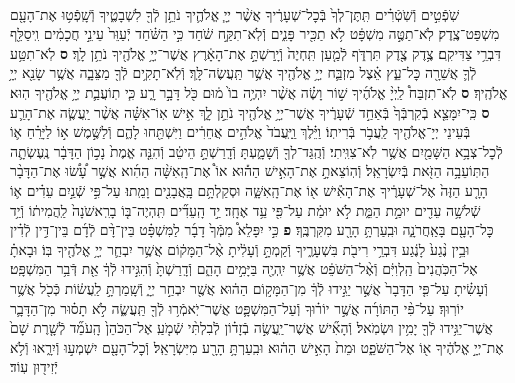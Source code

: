 \documentclass[twoside, openany, parskip=half, 11pt]{book}
\begin{document}
\begin{footnotesize}
\begin{multicols}{2}
\\
שֹֽׁפְֿטִ֣ים וְֿשֹֽׁטְֿרִ֗ים תִּֽתֶּן־לְךָ֙ בְּֿכׇל־שְׁעָרֶ֔יךָ אֲשֶׁ֨ר יְיָ֧ אֱלֹהֶ֛יךָ נֹתֵ֥ן לְֿךָ֖ לִשְׁבָטֶ֑יךָ וְֿשָֽׁפְֿט֥וּ אֶת־הָעָ֖ם מִשְׁפַּט־צֶֽדֶק׃ לֹֽא־תַטֶּ֣ה מִשְׁפָּ֔ט לֹ֥א תַכִּ֖יר פָּנִ֑ים וְֿלֹֽא־תִקַּ֣ח שֹׁ֔חַד כִּ֣י הַשֹּׁ֗חַד יְֿעַוֵּר֙ עֵינֵ֣י חֲכָמִ֔ים וִֽיסַלֵּ֖ף דִּבְרֵ֥י צַדִּיקִֽם׃ צֶ֥דֶק צֶ֖דֶק תִּרְדֹּ֑ף לְֿמַ֤עַן תִּֽחְיֶה֙ וְֿיָֽרַשְׁתָּ֣ אֶת־הָאָ֔רֶץ אֲשֶׁר־יְיָ֥ אֱלֹהֶ֖יךָ נֹתֵ֥ן לָֽךְ׃ \textbf{ס}
לֹֽא־תִטַּ֥ע לְֿךָ֛ אֲשֵׁרָ֖ה כׇּל־עֵ֑ץ אֵ֗צֶל מִזְבַּ֛ח יְיָ֥ אֱלֹהֶ֖יךָ אֲשֶׁ֥ר תַּֽעֲשֶׂה־לָּֽךְ׃ וְֿלֹֽא־תָקִ֥ים לְֿךָ֖ מַצֵּבָ֑ה אֲשֶׁ֥ר שָׂנֵ֖א יְיָ֥ אֱלֹהֶֽיךָ׃ \textbf{ס} לֹֽא־תִזְבַּח֩ לַֽיְיָ֨ אֱלֹהֶ֜יךָ שׁ֣וֹר וָשֶׂ֗ה אֲשֶׁ֨ר יִהְיֶ֥ה בוֹ֙ מ֔וּם כֹּ֖ל דָּבָ֣ר רָ֑ע כִּ֧י תֽוֹעֲבַ֛ת יְיָ֥ אֱלֹהֶ֖יךָ הֽוּא׃ \textbf{ס} כִּֽי־יִמָּצֵ֤א בְֿקִרְבְּֿךָ֙ בְּֿאַחַ֣ד שְֿׁעָרֶ֔יךָ אֲשֶׁר־יְיָ֥ אֱלֹהֶ֖יךָ נֹתֵ֣ן לָ֑ךְ אִ֣ישׁ אֽוֹ־אִשָּׁ֗ה אֲשֶׁ֨ר יַֽעֲשֶׂ֧ה אֶת־הָרַ֛ע בְּֿעֵינֵי יְיָ־אֱלֹהֶ֖יךָ לַֽעֲבֹ֥ר בְּֿרִיתֽוֹ׃ וַיֵּ֗לֶךְ וַֽיַּֽעֲבֹד֙ אֱלֹהִ֣ים אֲחֵרִ֔ים וַיִּשְׁתַּ֖חוּ לָהֶ֑ם וְֿלַשֶּׁ֣מֶשׁ א֣וֹ לַיָּרֵ֗חַ א֛וֹ לְֿכׇל־צְבָ֥א הַשָּׁמַ֖יִם אֲשֶׁ֥ר לֹֽא־צִוִּֽיתִי׃ וְֿהֻֽגַּד־לְךָ֖ וְֿשָׁמָ֑עְתָּ וְֿדָֽרַשְׁתָּ֣ הֵיטֵ֔ב וְֿהִנֵּ֤ה אֱמֶת֙ נָכ֣וֹן הַדָּבָ֔ר נֶֽעֶשְׂתָ֛ה הַתּֽוֹעֵבָ֥ה הַזֹּ֖את בְּֿיִשְׂרָאֵֽל׃ וְֿהֽוֹצֵאתָ֣ אֶת־הָאִ֣ישׁ הַה֡וּא אוֹ֩ אֶת־הָֽאִשָּׁ֨ה הַהִ֜וא אֲשֶׁ֣ר עָ֠שׂ֠וּ אֶת־הַדָּבָ֨ר הָרָ֤ע הַזֶּה֙ אֶל־שְׁעָרֶ֔יךָ אֶת־הָאִ֕ישׁ א֖וֹ אֶת־הָֽאִשָּׁ֑ה וּסְקַלְתָּ֥ם בָּֽאֲבָנִ֖ים וָמֵֽתוּ׃ עַל־פִּ֣י שְֿׁנַ֣יִם עֵדִ֗ים א֛וֹ שְֿׁלשָׁ֥ה עֵדִ֖ים יוּמַ֣ת הַמֵּ֑ת לֹ֣א יוּמַ֔ת עַל־פִּ֖י עֵ֥ד אֶחָֽד׃ יַ֣ד הָֽעֵדִ֞ים תִּֽהְיֶה־בּ֤וֹ בָרִֽאשֹׁנָה֙ לַֽהֲמִית֔וֹ וְֿיַ֥ד כׇּל־הָעָ֖ם בָּאַֽחֲרֹנָ֑ה וּבִֽעַרְתָּ֥ הָרָ֖ע מִקִּרְבֶּֽךָ׃ \textbf{פ}
כִּ֣י יִפָּלֵא֩ מִמְּֿךָ֙ דָבָ֜ר לַמִּשְׁפָּ֗ט בֵּין־דָּ֨ם לְֿדָ֜ם בֵּין־דִּ֣ין לְֿדִ֗ין וּבֵ֥ין נֶ֨גַע֙ לָנֶ֔גַע דִּבְרֵ֥י רִיבֹ֖ת בִּשְׁעָרֶ֑יךָ וְֿקַמְתָּ֣ וְֿעָלִ֔יתָ אֶ֨ל־הַמָּק֔וֹם אֲשֶׁ֥ר יִבְחַ֛ר יְיָ֥ אֱלֹהֶ֖יךָ בּֽוֹ׃ וּבָאתָ֗ אֶל־הַכֹּֽהֲנִים֙ הַֽלְוִיִּ֔ם וְֿאֶ֨ל־הַשֹּׁפֵ֔ט אֲשֶׁ֥ר יִֽהְיֶ֖ה בַּיָּמִ֣ים הָהֵ֑ם וְֿדָֽרַשְׁתָּ֙ וְֿהִגִּ֣ידוּ לְֿךָ֔ אֵ֖ת דְּֿבַ֥ר הַמִּשְׁפָּֽט׃ וְֿעָשִׂ֗יתָ עַל־פִּ֤י הַדָּבָר֙ אֲשֶׁ֣ר יַגִּ֣ידוּ לְֿךָ֔ מִן־הַמָּק֣וֹם הַה֔וּא אֲשֶׁ֖ר יִבְחַ֣ר יְיָ֑ וְֿשָֽׁמַרְתָּ֣ לַֽעֲשׂ֔וֹת כְּֿכֹ֖ל אֲשֶׁ֥ר יוֹרֽוּךָ׃
עַל־פִּ֨י הַתּוֹרָ֜ה אֲשֶׁ֣ר יוֹר֗וּךָ וְֿעַל־הַמִּשְׁפָּ֛ט אֲשֶׁר־יֹֽאמְֿר֥וּ לְֿךָ֖ תַּֽעֲשֶׂ֑ה לֹ֣א תָס֗וּר מִן־הַדָּבָ֛ר אֲשֶׁר־יַגִּ֥ידוּ לְֿךָ֖ יָמִ֥ין וּשְׂמֹֽאל׃ וְֿהָאִ֞ישׁ אֲשֶׁר־יַֽעֲשֶׂ֣ה בְֿזָד֗וֹן לְֿבִלְתִּ֨י שְֿׁמֹ֤עַֽ אֶל־הַכֹּהֵן֙ הָֽעֹמֵ֞ד לְֿשָׁ֤רֶת שָׁם֙ אֶת־יְיָ֣ אֱלֹהֶ֔יךָ א֖וֹ אֶל־הַשֹּׁפֵ֑ט וּמֵת֙ הָאִ֣ישׁ הַה֔וּא וּבִֽעַרְתָּ֥ הָרָ֖ע מִיִּשְׂרָאֵֽל׃ וְֿכׇל־הָעָ֖ם יִשְׁמְע֣וּ וְֿיִרָ֑אוּ וְֿלֹ֥א יְֿזִיד֖וּן עֽוֹד׃


\end{multicols}
\end{footnotesize}
\end{document}
